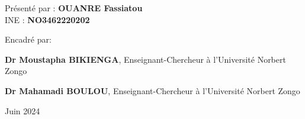 \begin{titlepage}
\begin{center}
\vspace{30pt}

{\fontsize{16}{1}\selectfont Présenté par : \textbf{OUANRE Fassiatou}} \\

\vspace{0.6 cm}
 INE : \textbf{NO3462220202}
\end{center}

\vspace{30pt}
{\fontsize{16}{1}\selectfont Encadré par:}\\
\vspace{2pt}

{\fontsize{14}{1}\selectfont \textbf{Dr Moustapha BIKIENGA}}, Enseignant-Chercheur à l'Université Norbert Zongo\\
\vspace{2pt}

{\fontsize{14}{1}\selectfont \textbf{Dr Mahamadi BOULOU}}, Enseignant-Chercheur à l'Université Norbert Zongo\\
\vspace{20pt}

\begin{center}
Juin 2024
\end{center}
\end{titlepage}
